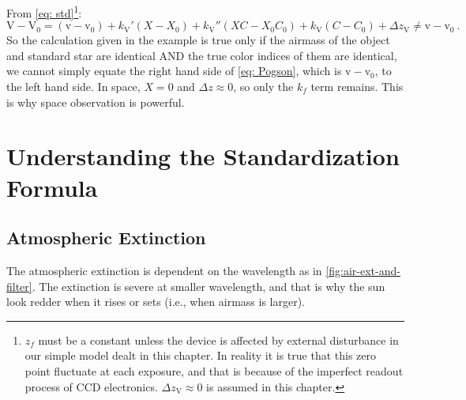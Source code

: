 
From \cref{eq: std}\footnote{$ z_{f} $ must be a constant unless the device is affected by external disturbance in our simple model dealt in this chapter. In reality it is true that this zero point fluctuate at each exposure, and that is because of the imperfect readout process of CCD electronics. $ \Delta z_\mathrm{V} \approx 0 $ is assumed in this chapter.}:
\begin{equation}
  \mathrm{V} - \mathrm{V}_0 
    = (\mathrm{v} - \mathrm{v}_0)
    + k_\mathrm{V}'(X - X_0)
    + k_\mathrm{V}''(X C - X_0 C_0)
    + k_\mathrm{V}(C - C_0)
    + \Delta z_\mathrm{V}
    \neq \mathrm{v} - \mathrm{v}_0 ~.
\end{equation}
So the calculation given in the example is true only if the airmass of the object and standard star are identical AND the true color indices of them are identical, we cannot simply equate the right hand side of \cref{eq: Pogson}, which is $ \mathrm{v} - \mathrm{v}_0 $, to the left hand side. In space, $ X = 0 $ and $ \Delta z \approx 0 $, so only the $ k_f $ term remains. This is why space observation is powerful.

\section{Understanding the Standardization Formula}

\subsection{Atmospheric Extinction}
The atmospheric extinction is dependent on the wavelength as in \cref{fig:air-ext-and-filter}. The extinction is severe at smaller wavelength, and that is why the sun look redder when it rises or sets (i.e., when airmass is larger). 

